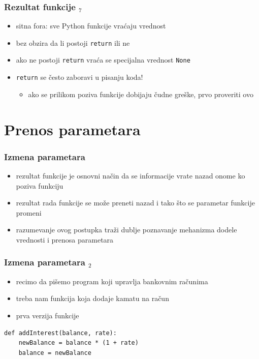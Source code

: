 \documentclass[compress]{beamer}
\begin{document}
\begin{frame}[fragile]
  \frametitle{Rezultat funkcije $_7$}
  \begin{itemize}
    \item sitna fora: sve Python funkcije vraćaju vrednost
    \item bez obzira da li postoji \texttt{return} ili ne
    \item ako ne postoji \texttt{return} vraća se specijalna vrednost \texttt{None}
    \item \texttt{return} se često zaboravi u pisanju koda!
    \begin{itemize}
      \item ako se prilikom poziva funkcije dobijaju čudne greške, prvo proveriti ovo
    \end{itemize}
  \end{itemize}
\end{frame}

\section{Prenos parametara}

\begin{frame}[fragile]
  \frametitle{Izmena parametara}
  \begin{itemize}
    \item rezultat funkcije je osnovni način da se informacije vrate nazad onome ko poziva funkciju
    \item rezultat rada funkcije se može preneti nazad i tako što se parametar funkcije promeni
    \item razumevanje ovog postupka traži dublje poznavanje mehanizma dodele vrednosti i prenosa parametara
  \end{itemize}
\end{frame}

\begin{frame}[fragile]
  \frametitle{Izmena parametara $_2$}
  \begin{itemize}
    \item recimo da pišemo program koji upravlja bankovnim računima
    \item treba nam funkcija koja dodaje kamatu na račun
    \item prva verzija funkcije
  \end{itemize}
\begin{verbatim}
def addInterest(balance, rate):
    newBalance = balance * (1 + rate)
    balance = newBalance
\end{verbatim}
\end{frame}
\end{document}

